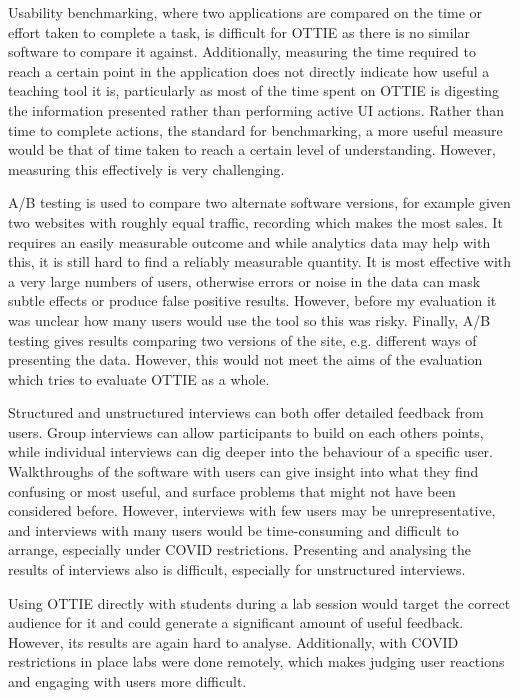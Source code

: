 \documentclass[a4paper,fleqn,oneside,12pt]{report}
\begin{document}
Usability benchmarking, where two applications are compared on the time or effort taken to complete a task, is difficult for OTTIE as there is no similar software to compare it against. Additionally, measuring the time required to reach a certain point in the application does not directly indicate how useful a teaching tool it is, particularly as most of the time spent on OTTIE is digesting the information presented rather than performing active UI actions. Rather than time to complete actions, the standard for benchmarking, a more useful measure would be that of time taken to reach a certain level of understanding. However, measuring this effectively is very challenging.

A/B testing is used to compare two alternate software versions, for example given two websites with roughly equal traffic, recording which makes the most sales. It requires an easily measurable outcome and while analytics data may help with this, it is still hard to find a reliably measurable quantity. It is most effective with a very large numbers of users, otherwise errors or noise in the data can mask subtle effects or produce false positive results. However, before my evaluation it was unclear how many users would use the tool so this was risky. Finally, A/B testing gives results comparing two versions of the site, e.g. different ways of presenting the data. However, this would not meet the aims of the evaluation which tries to evaluate OTTIE as a whole.

Structured and unstructured interviews can both offer detailed feedback from users. Group interviews can allow participants to build on each others points, while individual interviews can dig deeper into the behaviour of a specific user. Walkthroughs of the software with users can give insight into what they find confusing or most useful, and surface problems that might not have been considered before. However, interviews with few users may be unrepresentative, and interviews with many users would be time-consuming and difficult to arrange, especially under COVID restrictions. Presenting and analysing the results of interviews also is difficult, especially for unstructured interviews.

Using OTTIE directly with students during a lab session would target the correct audience for it and could generate a significant amount of useful feedback. However, its results are again hard to analyse. Additionally, with COVID restrictions in place labs were done remotely, which makes judging user reactions and engaging with users more difficult.
\end{document}

